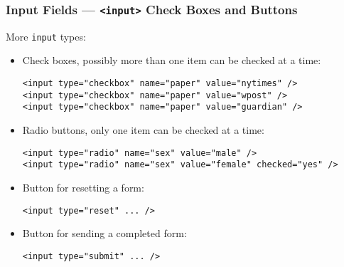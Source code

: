 \documentclass[dvipsnames]{beamer}
\begin{document}
\begin{frame}[fragile]
\frametitle{Input Fields --- \texttt{<input>} Check Boxes and Buttons }
  
  More \texttt{input} types:

\begin{itemize}
\item Check boxes, possibly more
  than one item can be checked at a time:
  \begin{small}
\begin{verbatim}
<input type="checkbox" name="paper" value="nytimes" /> 
<input type="checkbox" name="paper" value="wpost" />
<input type="checkbox" name="paper" value="guardian" />
\end{verbatim}  
  \end{small}

\item Radio buttons, only one item can be checked at a time:
  \begin{footnotesize}
\begin{verbatim}
<input type="radio" name="sex" value="male" />
<input type="radio" name="sex" value="female" checked="yes" />
\end{verbatim}
  \end{footnotesize}
\item Button for resetting a form:
  \begin{small}
\begin{verbatim}
<input type="reset" ... />
\end{verbatim}
  \end{small}
\item Button for sending a completed form:
  \begin{small}
\begin{verbatim}
<input type="submit" ... />
\end{verbatim}
  \end{small}
\end{itemize}
\end{frame}
\end{document}

